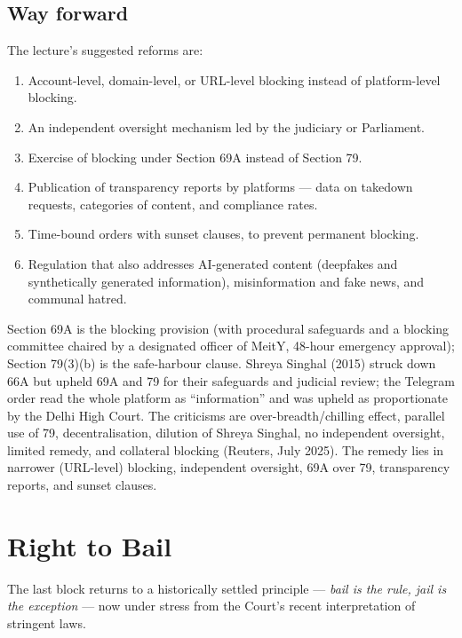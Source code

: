 \subsection{Way forward}

The lecture's suggested reforms are:

\begin{enumerate}
  \item Account-level, domain-level, or URL-level blocking instead of platform-level
        blocking.
  \item An independent oversight mechanism led by the judiciary or Parliament.
  \item Exercise of blocking under Section 69A instead of Section 79.
  \item Publication of transparency reports by platforms — data on takedown requests,
        categories of content, and compliance rates.
  \item Time-bound orders with sunset clauses, to prevent permanent blocking.
  \item Regulation that also addresses AI-generated content (deepfakes and synthetically
        generated information), misinformation and fake news, and communal hatred.
\end{enumerate}

\begin{QuickRevision}
Section 69A is the blocking provision (with procedural safeguards and a blocking
committee chaired by a designated officer of MeitY, 48-hour emergency approval); Section
79(3)(b) is the safe-harbour clause. Shreya Singhal (2015) struck down 66A but upheld 69A
and 79 for their safeguards and judicial review; the Telegram order read the whole
platform as ``information'' and was upheld as proportionate by the Delhi High Court. The
criticisms are over-breadth/chilling effect, parallel use of 79, decentralisation,
dilution of Shreya Singhal, no independent oversight, limited remedy, and collateral
blocking (Reuters, July 2025). The remedy lies in narrower (URL-level) blocking,
independent oversight, 69A over 79, transparency reports, and sunset clauses.
\end{QuickRevision}

\section{Right to Bail}
\label{sec:right-to-bail}

The last block returns to a historically settled principle — \emph{bail is the rule, jail
is the exception} — now under stress from the Court's recent interpretation of stringent
laws.

